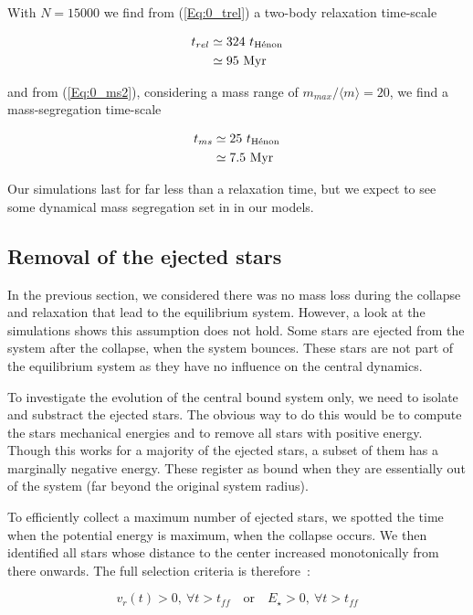  With $N = 15 000$  we find from (\ref{Eq:0_trel}) a two-body relaxation time-scale

\begin{align}
t_{rel}  &\simeq 324~ t_{\textrm{H\'enon}}\\
	     &\simeq 95~ {\textrm{Myr}}
\end{align}

and from (\ref{Eq:0_ms2}), considering a mass range of $m_{max}/\langle m\rangle = 20$, we find a mass-segregation time-scale

\begin{align}
t_{ms}  &\simeq 25~ t_{\textrm{H\'enon}}\\
	    &\simeq 7.5~ {\textrm{Myr}}
\end{align}

Our simulations last for far less than a relaxation time, but we expect to see some dynamical mass segregation set in in our models.


\subsection{Removal of the ejected stars}

In the previous section, we considered there was no mass loss during the collapse and relaxation that lead to the equilibrium system. However, a look at the simulations shows this assumption does not hold. Some stars are ejected from the system after the collapse, when the system bounces. These stars are not part of the equilibrium system as they have no influence on the central dynamics.

To investigate the evolution of the central bound system only, we need to isolate and substract the ejected stars. The obvious way to do this would be to compute the stars mechanical energies and to remove all stars with positive energy. Though this works for a majority of the ejected stars, a subset of them has a marginally negative energy. These register as bound when they are essentially out of the system (far beyond the original system radius). 

To efficiently collect a maximum number of ejected stars, we spotted the time when the potential energy is maximum, when the collapse occurs. We  then identified all stars whose distance to the center increased monotonically from there onwards. The full selection criteria is therefore~:

\begin{equation}
v_r(t) > 0,~\forall t > t_{ff}\quad \textrm{or} \quad  E_\star > 0 , ~\forall t > t_{ff}
\end{equation}
 
